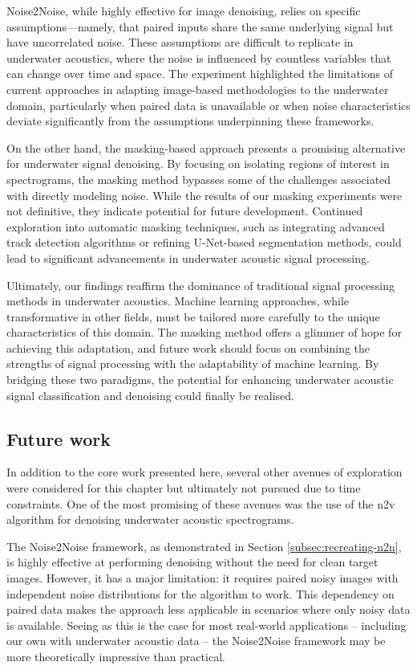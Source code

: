 Noise2Noise, while highly effective for image denoising, relies on specific assumptions—namely, that paired inputs share the same underlying signal but have uncorrelated noise. These assumptions are difficult to replicate in underwater acoustics, where the noise is influenced by countless variables that can change over time and space. The experiment highlighted the limitations of current approaches in adapting image-based methodologies to the underwater domain, particularly when paired data is unavailable or when noise characteristics deviate significantly from the assumptions underpinning these frameworks.

On the other hand, the masking-based approach presents a promising alternative for underwater signal denoising. By focusing on isolating regions of interest in spectrograms, the masking method bypasses some of the challenges associated with directly modeling noise. While the results of our masking experiments were not definitive, they indicate potential for future development. Continued exploration into automatic masking techniques, such as integrating advanced track detection algorithms or refining U-Net-based segmentation methods, could lead to significant advancements in underwater acoustic signal processing.

Ultimately, our findings reaffirm the dominance of traditional signal processing methods in underwater acoustics. Machine learning approaches, while transformative in other fields, must be tailored more carefully to the unique characteristics of this domain. The masking method offers a glimmer of hope for achieving this adaptation, and future work should focus on combining the strengths of signal processing with the adaptability of machine learning. By bridging these two paradigms, the potential for enhancing underwater acoustic signal classification and denoising could finally be realised.

\subsection{Future work}

In addition to the core work presented here, several other avenues of exploration were considered for this chapter but ultimately not pursued due to time constraints. One of the most promising of these avenues was the use of the \acrfull{n2v} algorithm for denoising underwater acoustic spectrograms.

The Noise2Noise framework, as demonstrated in Section \ref{subsec:recreating-n2n}, is highly effective at performing denoising without the need for clean target images. However, it has a major limitation: it requires paired noisy images with independent noise distributions for the algorithm to work. This dependency on paired data makes the approach less applicable in scenarios where only noisy data is available. Seeing as this is the case for most real-world applications -- including our own with underwater acoustic data -- the Noise2Noise framework may be more theoretically impressive than practical.

